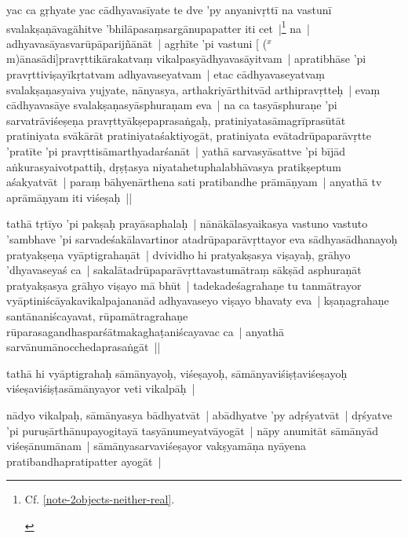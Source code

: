 \documentclass[article,a4paper]{memoir}
\newcommand{\corr}[1]{($^{x}$#1)}
\begin{document}
	  \pstart yac ca gṛhyate yac cā\-dhyavasī\-yate te dve 'py anyanivṛttī\- na vastunī\- svalakṣaṇā\-vagā\-hitve 'bhilā\-pasaṃsargā\-nupapatter iti cet |\footnote{\label{RNA-n-0}  \begin{english}Cf. \ref{note-2objects-neither-real}.\end{english}} \label{thakur75-73.9} na | adhyavasā\-yasvarū\-pā\-parijñā\-nā\-t | agṛhī\-te 'pi vastuni [ {\corr mā\-nasā\-di}]pravṛttikā\-rakatvaṃ vikalpasyā\-dhyavasā\-yitvam | apratibhā\-se 'pi pravṛttiviṣayī\-kṛtatvam adhyavaseyatvam | etac cā\-dhyavaseyatvaṃ svalakṣaṇasyaiva yujyate, nā\-nyasya, arthakriyā\-rthitvā\-d arthipravṛtteḥ | \label{thakur75-73.12} evaṃ cā\-dhyavasā\-ye svalakṣaṇasyā\-sphuraṇam eva | na ca tasyā\-sphuraṇe 'pi sarvatrā\-viśeṣeṇa pravṛttyā\-kṣepaprasaṅgaḥ, pratiniyatasā\-magrī\-prasū\-tā\-t pratiniyata svā\-kā\-rā\-t pratiniyataśaktiyogā\-t, pratiniyata evā\-tadrū\-paparā\-vṛtte 'pratī\-te 'pi pravṛttisā\-marthyadarśanā\-t | yathā\- sarvasyā\-sattve 'pi bī\-jā\-d aṅkurasyaivotpattiḥ, dṛṣṭasya niyatahetuphalabhā\-vasya pratikṣeptum aśakyatvā\-t | paraṃ bā\-hyenā\-rthena sati pratibandhe prā\-mā\-ṇyam | anyathā\- tv aprā\-mā\-ṇyam iti viśeṣaḥ ||
	\pend
      

	  \pstart tathā\- tṛtī\-yo 'pi pakṣaḥ prayā\-saphalaḥ | nā\-nā\-kā\-lasyaikasya vastuno vastuto 'sambhave 'pi sarvadeśakā\-lavartinor atadrū\-paparā\-vṛttayor eva sā\-dhyasā\-dhanayoḥ pratyakṣeṇa vyā\-ptigrahaṇā\-t | \label{thakur75-73.20} dvividho hi pratyakṣasya viṣayaḥ, grā\-hyo 'dhyavaseyaś ca | sakalā\-tadrū\-paparā\-vṛttavastumā\-traṃ sā\-kṣā\-d asphuraṇā\-t pratyakṣasya grā\-hyo viṣayo mā\- bhū\-t | tadekadeśagrahaṇe tu tanmā\-trayor vyā\-ptiniścā\-yakavikalpajananā\-d adhyavaseyo viṣayo bhavaty eva | kṣaṇagrahaṇe santā\-naniścayavat, rū\-pamā\-tragrahaṇe rū\-parasagandhasparśā\-tmakaghaṭaniścayavac ca | anyathā\- sarvā\-numā\-nocchedaprasaṅgā\-t ||
	\pend
      

	  \pstart tathā\- hi vyā\-ptigrahaḥ sā\-mā\-nyayoḥ, viśeṣayoḥ, sā\-mā\-nyaviśiṣṭaviśeṣayoḥ viśeṣaviśiṣṭasā\-mā\-nyayor veti vikalpā\-ḥ |
	\pend
      

	  \pstart nā\-dyo vikalpaḥ, sā\-mā\-nyasya bā\-dhyatvā\-t | abā\-dhyatve 'py adṛśyatvā\-t | dṛśyatve 'pi puruṣā\-rthā\-nupayogitayā\- tasyā\-numeyatvā\-yogā\-t | nā\-py anumitā\-t sā\-mā\-nyā\-d viśeṣā\-numā\-nam | sā\-mā\-nyasarvaviśeṣayor vakṣyamā\-ṇa nyā\-yena pratibandhapratipatter ayogā\-t |
	\pend
      
\end{document}
